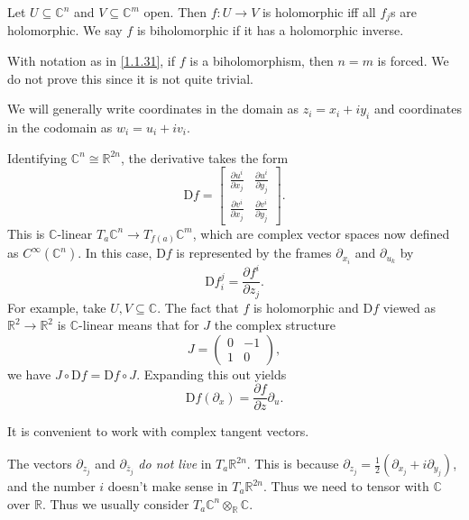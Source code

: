 \begin{definition}\label{1.1.31}
	Let $U\subseteq \mathbb{C} ^n$ and $V\subseteq \mathbb{C} ^m$ open. Then $f : U \to V$ is holomorphic iff all $f_j$s are holomorphic. We say $f$ is biholomorphic if it has a holomorphic inverse.
\end{definition}
\begin{remark}\label{1.1.32}
	With notation as in \cref{1.1.31}, if $f$ is a biholomorphism, then $n=m$ is forced. We do not prove this since it is not quite trivial.
\end{remark}
\begin{notation}\label{1.1.33}
	We will generally write coordinates in the domain as $z_i=x_i+iy_i$ and coordinates in the codomain as $w_i=u_i+iv_i$.
\end{notation}

Identifying $\mathbb{C} ^n \cong \mathbb{R} ^{2n} $, the derivative takes the form
\[
	\mathrm{D} f=\begin{bmatrix}
		\frac{\partial u^i}{\partial x_j}  & \frac{\partial u^i}{\partial y_j}  \\
	\frac{\partial v^i}{\partial x_j}  & \frac{\partial v^i}{\partial y_j} 
	\end{bmatrix}
.\]
This is $\mathbb{C} $-linear $T_a\mathbb{C} ^n\to T_{f(a)} \mathbb{C} ^m$, which are complex vector spaces now defined as $C^\infty (\mathbb{C} ^n)$. In this case, $\mathrm{D} f$ is represented by the frames $\partial _{x_i} $ and $\partial _{u_k} $ by
\[
	\mathrm{D} f_i^j=\frac{\partial f^i}{\partial z_j} 
.\]
For example, take $U,V\subseteq \mathbb{C} $. The fact that $f$ is holomorphic and $\mathrm{D} f$ viewed as $\mathbb{R} ^2\to \mathbb{R} ^2$ is $\mathbb{C} $-linear means that for $J$ the complex structure
\[
	J=\begin{pmatrix}
	0 & -1 \\
	1 & 0
	\end{pmatrix},
\]
we have $J\circ \mathrm{D} f=\mathrm{D} f\circ J$. Expanding this out yields
\[
	\mathrm{D} f(\partial _x)= \frac{\partial f}{\partial z} \partial_u
.\]

It is convenient to work with complex tangent vectors.

\begin{warning}\label{1.1.34}
	The vectors $\partial _{z_j} $ and $\partial _{\overline{z} _j} $ \emph{do not live} in $T_a\mathbb{R} ^{2n} $. This is because $\partial _{z_j} =\frac{1}{2} (\partial _{x_j} +i \partial _{y_j} )$, and the number $i$ doesn't make sense in $T_a\mathbb{R} ^{2n} $. Thus we need to tensor with $\mathbb{C} $ over $\mathbb{R} $. Thus we usually consider $T_a\mathbb{C} ^n \otimes _\mathbb{R} \mathbb{C} $.
\end{warning}

